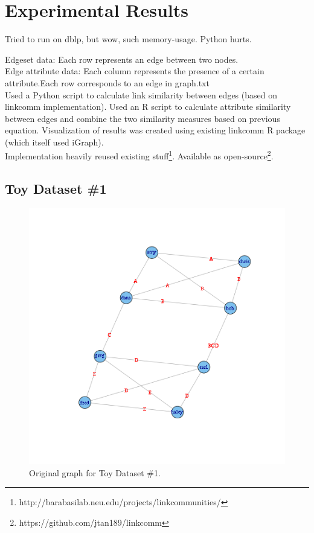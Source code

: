 \documentclass{report}
\begin{document}
\section*{Experimental Results}

Tried to run on dblp, but wow, such memory-usage. Python hurts.

Edgeset data: Each row represents an edge between two nodes.\\
Edge attribute data: Each column represents the presence of a certain attribute.Each row corresponds to an edge in graph.txt\\

Used a Python script to calculate link similarity between edges (based on linkcomm implementation).
Used an R script to calculate attribute similarity between edges and combine the two similarity measures based on previous equation.
Visualization of results was created using existing linkcomm R package (which itself used iGraph).\\

Implementation heavily reused existing stuff\footnote{http://barabasilab.neu.edu/projects/linkcommunities/}. Available as open-source\footnote{https://github.com/jtan189/linkcomm}.

\subsection*{Toy Dataset \#1}

\begin{figure}[htp!]
  \centering
  \includegraphics[width=0.65\linewidth]{toy2/orig.png}
  \caption{Original graph for Toy Dataset \#1.}
\end{figure}
\end{document}
